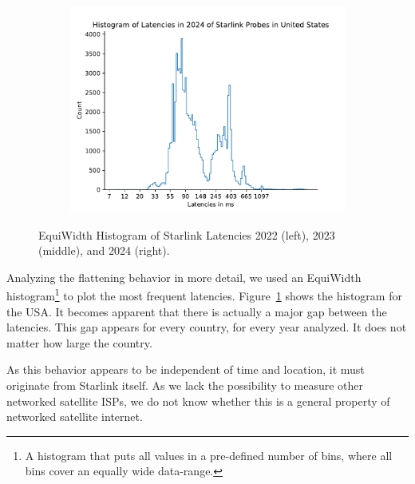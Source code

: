 \begin{figure}
\begin{subfigure}[b]{0.3\linewidth}
		\includegraphics[width=\linewidth]{chapters/4-results/latency/img/histogram_of_latencies_in_2024_of_starlink_probes_in_united_states.pdf}
	\end{subfigure}
	\caption{EquiWidth Histogram of Starlink Latencies 2022 (left), 2023 (middle), and 2024 (right).}
	\label{fig:latency-histogram-usa}
\end{figure}

Analyzing the flattening behavior in more detail, we used an EquiWidth
histogram\footnote{A histogram that puts all values in a pre-defined number of
	bins, where all bins cover an equally wide data-range.} to plot the
most frequent latencies. Figure~\ref{fig:latency-histogram-usa} shows the
histogram for the USA. It becomes apparent that there is actually a major gap
between the latencies. This gap appears for every country, for every year
analyzed. It does not matter how large the country.

As this behavior appears to be independent of time and location, it must
originate from Starlink itself. As we lack the possibility to measure other
networked satellite ISPs, we do not know whether this is a general property of
networked satellite internet.

